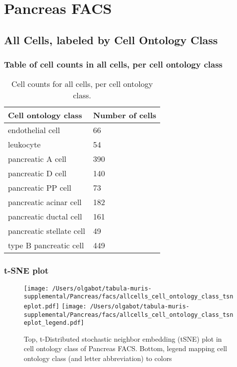 \newpage
\section{Pancreas FACS}

\subsection{All Cells, labeled by Cell Ontology Class}
\subsubsection{Table of cell counts in all cells, per cell ontology class}\begin{table}[h]
\centering
\label{my-label}
\begin{tabular}{@{}ll@{}}
\toprule

Cell ontology class& Number of cells \\ \midrule
endothelial cell & 66 \\

leukocyte & 54 \\

pancreatic A cell & 390 \\

pancreatic D cell & 140 \\

pancreatic PP cell & 73 \\

pancreatic acinar cell & 182 \\

pancreatic ductal cell & 161 \\

pancreatic stellate cell & 49 \\

type B pancreatic cell & 449 \\
\bottomrule
\end{tabular}
\caption{Cell counts for all cells, per cell ontology class.}
\end{table}

\newpage
\subsubsection{t-SNE plot}
\begin{figure}[h]
\centering
\texttt{[image: /Users/olgabot/tabula-muris-supplemental/Pancreas/facs/allcells\_cell\_ontology\_class\_tsneplot.pdf]}
\texttt{[image: /Users/olgabot/tabula-muris-supplemental/Pancreas/facs/allcells\_cell\_ontology\_class\_tsneplot\_legend.pdf]}
\caption{Top, t-Distributed stochastic neighbor embedding (tSNE) plot  in cell ontology class of Pancreas FACS. Bottom, legend mapping cell ontology class (and letter abbreviation) to colors}
\end{figure}


